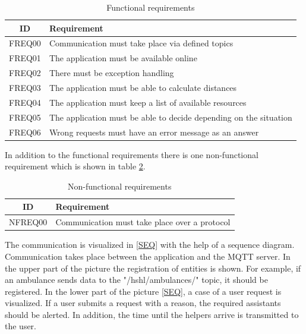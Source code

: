 \begin{table}[h]
    \centering
    \begin{tabular}{c|l}
    ID & Requirement  \\
    \hline
    FREQ00 & Communication must take place via defined topics \\
    FREQ01 & The application must be available online \\
    FREQ02 & There must be exception handling \\
    FREQ03 & The application must be able to calculate distances \\
    FREQ04 & The application must keep a list of available resources\\
    FREQ05 & The application must be able to decide depending on the situation \\
    FREQ06 & Wrong requests must have an error message as an answer \\
    \end{tabular}
    \caption{Functional requirements}
    \label{fr}
\end{table}


In addition to the functional requirements there is one non-functional requirement which is shown in table \ref{nfr}.

\begin{table}[h]
    \centering
    \begin{tabular}{c|l}
    ID & Requirement  \\
    \hline
    NFREQ00 & Communication must take place over a protocol \\

    \end{tabular}
    \caption{Non-functional requirements}
    \label{nfr}
\end{table}

The communication is visualized in \ref{SEQ} with the help of a sequence diagram. Communication takes place between the application and the MQTT server. In the upper part of the picture the registration of entities is shown. For example, if an ambulance sends data to the "/hshl/ambulances/" topic, it should be registered. In the lower part of the picture \ref{SEQ}, a case of a user request is visualized. If a user submits a request with a reason, the required assistants should be alerted. In addition, the time until the helpers arrive is transmitted to the user.

